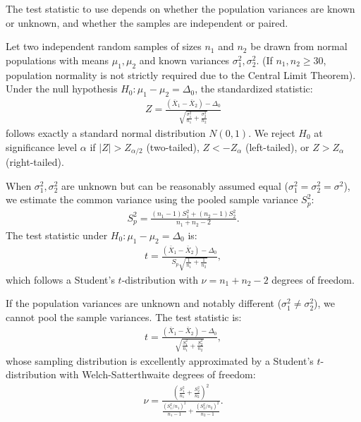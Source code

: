 The test statistic to use depends on whether the population variances are known or unknown, and whether the samples are independent or paired.

\begin{teorema}
	Let two independent random samples of sizes $n_1$ and $n_2$ be drawn from normal populations with means $\mu_1, \mu_2$ and known variances $\sigma_1^2, \sigma_2^2$. (If $n_1, n_2 \geq 30$, population normality is not strictly required due to the Central Limit Theorem). Under the null hypothesis $H_0: \mu_1 - \mu_2 = \Delta_0$, the standardized statistic:
	\begin{align}
		Z = \frac{(\bar{X}_1 - \bar{X}_2) - \Delta_0}{\sqrt{\frac{\sigma_1^2}{n_1} + \frac{\sigma_2^2}{n_2}}}
	\end{align}
	follows exactly a standard normal distribution $N(0,1)$. We reject $H_0$ at significance level $\alpha$ if $|Z| > Z_{\alpha/2}$ (two-tailed), $Z < -Z_\alpha$ (left-tailed), or $Z > Z_\alpha$ (right-tailed).
\end{teorema}

\begin{teorema}
	When $\sigma_1^2, \sigma_2^2$ are unknown but can be reasonably assumed equal ($\sigma_1^2 = \sigma_2^2 = \sigma^2$), we estimate the common variance using the pooled sample variance $S_p^2$:
	\begin{align}
		S_p^2 = \frac{(n_1 - 1)S_1^2 + (n_2 - 1)S_2^2}{n_1 + n_2 - 2}.
	\end{align}
	The test statistic under $H_0: \mu_1 - \mu_2 = \Delta_0$ is:
	\begin{align}
		t = \frac{(\bar{X}_1 - \bar{X}_2) - \Delta_0}{S_p \sqrt{\frac{1}{n_1} + \frac{1}{n_2}}},
	\end{align}
	which follows a Student's $t$-distribution with $\nu = n_1 + n_2 - 2$ degrees of freedom.
\end{teorema}

\begin{teorema}
	If the population variances are unknown and notably different ($\sigma_1^2 \neq \sigma_2^2$), we cannot pool the sample variances. The test statistic is:
	\begin{align}
		t = \frac{(\bar{X}_1 - \bar{X}_2) - \Delta_0}{\sqrt{\frac{S_1^2}{n_1} + \frac{S_2^2}{n_2}}},
	\end{align}
	whose sampling distribution is excellently approximated by a Student's $t$-distribution with Welch-Satterthwaite degrees of freedom:
	\begin{align}
		\nu = \frac{\left( \frac{S_1^2}{n_1} + \frac{S_2^2}{n_2} \right)^2}{\frac{\left(S_1^2/n_1\right)^2}{n_1 - 1} + \frac{\left(S_2^2/n_2\right)^2}{n_2 - 1}}.
	\end{align}
\end{teorema}

